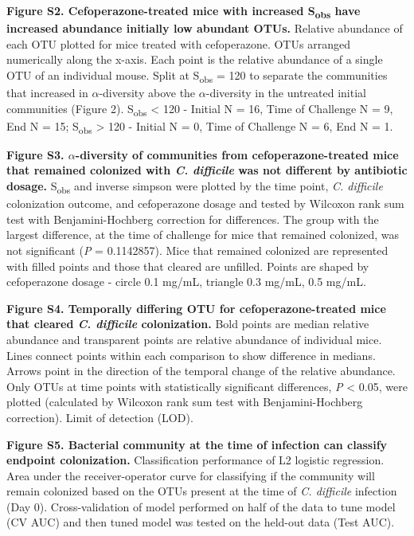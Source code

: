 \documentclass[12pt,]{article}
\begin{document}
\hfill\break

\textbf{Figure S2. Cefoperazone-treated mice with increased
S\textsubscript{obs} have increased abundance initially low abundant
OTUs.} Relative abundance of each OTU plotted for mice treated with
cefoperazone. OTUs arranged numerically along the x-axis. Each point is
the relative abundance of a single OTU of an individual mouse. Split at
S\textsubscript{obs} = 120 to separate the communities that increased in
\(\alpha\)-diversity above the \(\alpha\)-diversity in the untreated
initial communities (Figure 2). S\textsubscript{obs} \textless{} 120 -
Initial N = 16, Time of Challenge N = 9, End N = 15;
S\textsubscript{obs} \textgreater{} 120 - Initial N = 0, Time of
Challenge N = 6, End N = 1.

\hfill\break

\textbf{Figure S3. \(\alpha\)-diversity of communities from
cefoperazone-treated mice that remained colonized with \emph{C.
difficile} was not different by antibiotic dosage.} S\textsubscript{obs}
and inverse simpson were plotted by the time point, \emph{C. difficile}
colonization outcome, and cefoperazone dosage and tested by Wilcoxon
rank sum test with Benjamini-Hochberg correction for differences. The
group with the largest difference, at the time of challenge for mice
that remained colonized, was not significant (\emph{P} = 0.1142857).
Mice that remained colonized are represented with filled points and
those that cleared are unfilled. Points are shaped by cefoperazone
dosage - circle 0.1 mg/mL, triangle 0.3 mg/mL, 0.5 mg/mL.

\hfill\break

\textbf{Figure S4. Temporally differing OTU for cefoperazone-treated
mice that cleared \emph{C. difficile} colonization.} Bold points are
median relative abundance and transparent points are relative abundance
of individual mice. Lines connect points within each comparison to show
difference in medians. Arrows point in the direction of the temporal
change of the relative abundance. Only OTUs at time points with
statistically significant differences, \emph{P} \textless{} 0.05, were
plotted (calculated by Wilcoxon rank sum test with Benjamini-Hochberg
correction). Limit of detection (LOD).

\hfill\break

\textbf{Figure S5. Bacterial community at the time of infection can
classify endpoint colonization.} Classification performance of L2
logistic regression. Area under the receiver-operator curve for
classifying if the community will remain colonized based on the OTUs
present at the time of \emph{C. difficile} infection (Day 0).
Cross-validation of model performed on half of the data to tune model
(CV AUC) and then tuned model was tested on the held-out data (Test
AUC).
\end{document}
